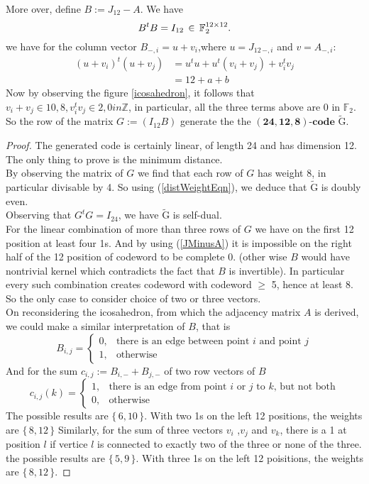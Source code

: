 \documentclass[12pt]{article}
\theoremstyle{definition}
\numberwithin{equation}{theorem}
\numberwithin{figure}{theorem}
\newcommand{\Ftwo}{\ensuremath{\mathbb{F}_2}}
\newcommand{\cCodes}{\ensuremath{\widetilde{\mathrm{G}}}}
\newcommand{\linearCode}[3]{\ensuremath{\bm{(#1,#2,#3)\mbox{-}code}}}
\newcommand{\myMatrixRing}[2]{\ensuremath{#1^{#2\times#2}}}
\newcommand{\Integer}{\ensuremath{\mathbb{Z}}}
\begin{document}
More over, define $B := J_{12} - A$. We have 
\begin{equation}\label{JMinusA}
	B^tB = I_{12} \,\in \,{\myMatrixRing{\Ftwo}{12}}.\\
\end{equation}
we have for the column vector $B_{-,i} = u + v_i$,where $u = J_{12\,-,i}$ and $v = A_{-,i}$:
\begin{align*}
	(u + v_i)^t(u + v_j) &= u^tu + u^t(v_i + v_j) + v_i^tv_j\\
						 &= 12 + a + b
\end{align*}
Now by observing the figure \ref{icosahedron}, it follows that
$v_i + v_j \in {10,8}, v_i^tv_j \in {2,0} in \Integer$, in particular, all the three terms above are 0 in $\Ftwo$. So  the row of the matrix $G := (I_{12} B)$  generate the the {\linearCode{24}{12}{8}} \cCodes.
\begin{proof}
The generated code is certainly linear, of length 24 and has dimension 12. The only thing to prove is the minimum distance.\\
By observing the matrix of $G$ we find that each row of $G$ has weight 8, in particular divisable by 4. So using (\ref{distWeightEqn}), we deduce that {\cCodes} is doubly even.\\
Observing that $G^tG = I_{24}$, we have {\cCodes} is self-dual.\\
For the linear combination of more than three rows of $G$ we have on the first 12 position at least four 1s. And by using (\ref{JMinusA}) it is impossible on the right half of the 12 position of codeword to be complete 0. (other wise $B$ would have nontrivial kernel which contradicts the fact that $B$ is invertible). In particular every such combination creates codeword with codeword $\geq$ 5, hence at least 8. So the only case to consider choice of two or three vectors. \\
On reconsidering the icosahedron, from which the adjacency matrix $A$ is derived, we could make a similar interpretation of $B$, that is 
\[
	B_{i,j} = 
	\begin{cases}
		0, &\text{there is an edge between point $i$ and point $j$}\\
		1, &\text{otherwise}
	\end{cases}
\]
And for the sum $c_{i,j} := B_{i,-} + B_{j,-} $ of two row vectors of $B$
\[
	c_{i,j}(k) = 
	\begin{cases}
		1, &\text{there is an edge from point $i$ or $j$ to $k$, but not both}\\
		0, &\text{otherwise}
	\end{cases}
\]
The possible results are $\{\,6,10\,\}$. With two 1s on the left 12 positions,  the weights are $\{\,8,12\,\}$
Similarly, for the sum of three vectors $v_i$ ,$v_j$ and $v_k$, there is a 1 at position $l$ if vertice $l$ is connected to exactly two of the three or none of the three.
  the possible results are $\{\,5,9\,\}$. With three 1s on the left 12 poisitions, the weights are $\{\,8,12\,\}$. 
\end{proof}
\end{document}
